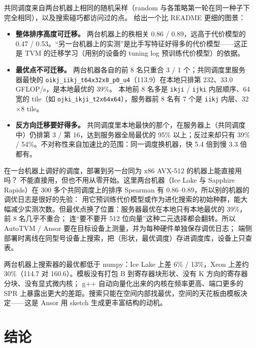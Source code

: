 \documentclass[11pt,a4paper]{ctexart}
\newcommand{\sk}[1]{\texttt{#1}}
\begin{document}
共同调度来自两台机器上相同的随机采样（random 与各策略第一轮在同一种子下完全相同），以及搜索碰巧都访问过的点。 给出一个比 README 更细的图景：

\begin{itemize}
  \item \textbf{整体排序高度可迁移。} 两台机器上的秩相关 0.86 / 0.89，远高于代价模型的 0.47 / 0.53。“另一台机器上的实测”是比手写特征好得多的代价模型——这正是 TVM 的迁移学习（用别的设备的 tuning log 预训练代价模型）的依据。
  \item \textbf{最优点不可迁移。} 两台机器各自的前 8 名只重合 3 / 1 个；共同调度里服务器最快的 \sk{oikj\_iikj\_t64x32x8\_p0\_u4}（113.9）在本地只排第 232、33.0 GFLOP/s，是本地最优的 39\%。
  本地前 8 名多是 \sk{ikji} / \sk{ijki} 内层顺序、64 宽的 tile（如 \sk{ojki\_ikji\_t2x64x64}），服务器前 8 名有 7 个是 \sk{iikj} 内层、32$\times$8 tile。
  \item \textbf{反方向迁移要好得多。} 共同调度里本地最快的那个，在服务器上（共同调度中）仍排第 3 / 第 16，达到服务器全局最优的 95\% 以上；反过来却只有 39\% / 54\%。不对称性来自加速比的范围：同一调度换机器，快 5.4 倍到慢 3.3 倍都有。
\end{itemize}

\begin{iqbox}{在一台机器上调好的调度，部署到另一台同为 x86 AVX-512 的机器上能直接用吗？}
不能直接用，但也不用从零开始。这里两台机器（Ice Lake 与 Sapphire Rapids）在 300 多个共同调度上的排序 Spearman 有 0.86--0.89，所以别的机器的调优日志是很好的先验：
用它预训练代价模型或作为进化搜索的初始种群，能大幅减少实测次数。但最优点换了位置：服务器最优在本地只有本地最优的 39\%，前 8 名几乎不重合；
连“要不要开 512 位向量”这种二元选择都会翻转。所以 AutoTVM / Ansor 要在目标设备上测量，并为每种硬件单独保存调优日志；
端侧部署时离线在同型号设备上搜索，把（形状，最优调度）存进调度库，设备上只查表。
\end{iqbox}

\begin{findingbox}[：模板的天花板]
两台机器上搜索器的最优都低于 numpy：Ice Lake 上差 6\% / 13\%，Xeon 上差约 30\%（114.7 对 160.6）。模板没有打包 B 到寄存器块形状、没有 K 方向的寄存器分块、没有显式微内核；
g++ 自动向量化出来的内核在频率更高、端口更多的 SPR 上暴露出更大的差距。搜索只能在空间内部找最优，空间的天花板由模板决定——这是 Ansor 用 sketch 生成更丰富结构的动机。
\end{findingbox}

\section{结论}
\end{document}
